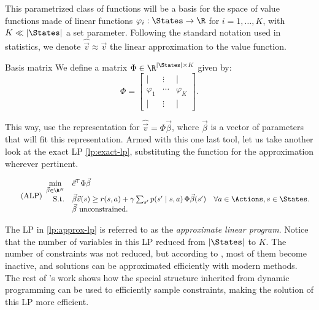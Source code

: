 This parametrized class of functions will be a basis for the space of value
functions made of linear functions $\varphi_i : \States \to \R$ for $i = 1,
\dots, K$, with $K \ll |\States|$ a set parameter. Following the standard
notation used in statistics, we denote $\widehat{\vec{v}} \approx \vec{v}$ the
linear approximation to the value function.

\begin{dfn}{Basis matrix}{}
    We define a matrix $\Phi \in \R^{|\States| \times K}$ given by:
    \begin{equation*}
        \Phi =
        \begin{bmatrix}
            | & \vdots & | \\
            \varphi_1 & \cdots & \varphi_K \\
            | & \vdots & |
        \end{bmatrix}.
    \end{equation*}
\end{dfn}

This way, use the representation for $\widehat{\vec{v}} = \Phi \vec{\beta}$,
where $\vec{\beta}$ is a vector of parameters that will fit this representation.
Armed with this one last tool, let us take another look at the exact LP
\eqref{lp:exact-lp}, substituting the function for the approximation wherever
pertinent.

\begin{equation}
\label{lp:approx-lp}
\tag{ALP}
\begin{array}{rl@{}ll}
    \displaystyle \min_{\vec{\beta} \in \R^{K}} & \vec{c}^{\top} \Phi \vec{\beta} \\
    \text{S.t.} & \vec{\beta}\vec{v} (s) \geq r(s,a) + \gamma \sum_{s'} p(s' \mid s, a) \, \Phi \vec{\beta} (s') & \quad \forall a \in \Actions, s \in \States. \\
    & \vec{\beta} \text{ unconstrained}.
\end{array}
\end{equation}

The LP in \eqref{lp:approx-lp} is referred to as the \textit{approximate linear
program}. Notice that the number of variables in this LP reduced from
$|\States|$ to $K$. The number of constraints was not reduced, but according to
\cite{farias2002thesis}, most of them become inactive, and solutions can be
approximated efficiently with modern methods. The rest of
\citeauthor{farias2002thesis}'s work shows how the special structure inherited
from dynamic programming can be used to efficiently sample constraints, making
the solution of this LP more efficient.

